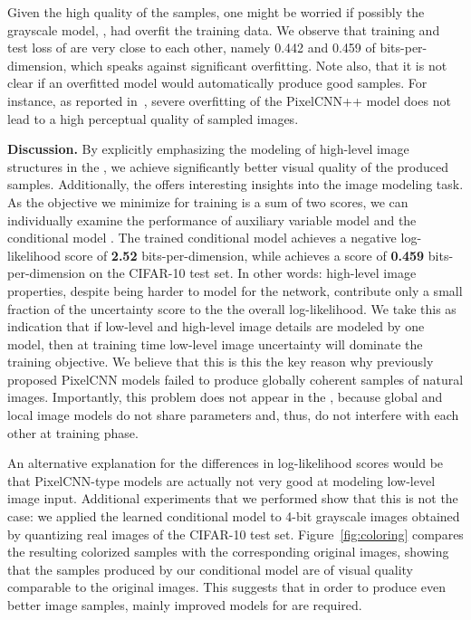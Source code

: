 Given the high quality of the samples, one might be worried if possibly 
the grayscale model, , had overfit the training data. 
We observe that training and test loss of  are 
very close to each other, namely 0.442 and 0.459 of bits-per-dimension, 
which speaks against significant overfitting. 
Note also, that it is not clear if an overfitted model would automatically produce good
samples.
For instance, as reported in~\cite{salimans2016pixel}, severe overfitting of the PixelCNN++
model does not lead to a high perceptual quality of sampled images.


\textbf{Discussion.} By explicitly emphasizing the modeling of high-level 
image structures in the \GRAY, we achieve significantly better visual 
quality of the produced samples.
Additionally, the \GRAY offers interesting insights into the image modeling task. 
As the objective we minimize for training is a sum of two scores, we can individually examine 
the performance of auxiliary variable model  and the conditional model .
The trained conditional model achieves  a negative log-likelihood score of \textbf{2.52} 
bits-per-dimension, while  achieves a score of \textbf{0.459} bits-per-dimension on the 
CIFAR-10 test set. In other words: high-level image properties, despite being harder to model for the 
network, contribute only a small fraction of the uncertainty score to the the overall log-likelihood. 
We take this as indication that if low-level and high-level image details are modeled by one 
model, then at training time low-level image uncertainty will dominate the training objective.
We believe that this is this the key reason why previously proposed PixelCNN models failed
to produce globally coherent samples of natural images.
Importantly, this problem does not appear in the \GRAY, because global and local image models
do not share parameters and, thus, do not interfere with each other at training phase.

An alternative explanation for the differences in log-likelihood scores would be 
that PixelCNN-type models are actually not very good at modeling low-level image input. 
Additional experiments that we performed show that this is not the case: 
we applied the learned conditional model  to 4-bit grayscale images
obtained by quantizing real images of the CIFAR-10 test set. Figure~\ref{fig:coloring} 
compares the resulting colorized samples with the corresponding original images,
showing that the samples produced by our conditional model are of visual quality comparable
to the original images.
This suggests that in order to produce even better image samples, 
mainly improved models for  are required. 

